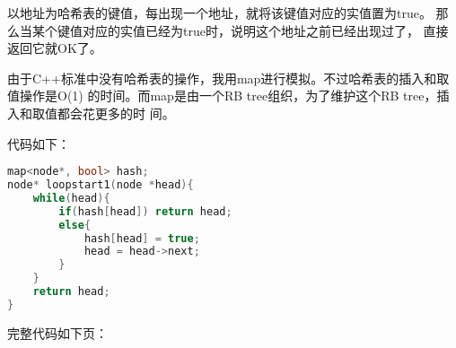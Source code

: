 \begin{description}
以地址为哈希表的键值，每出现一个地址，就将该键值对应的实值置为true。 那么当某个键值对应的实值已经为true时，说明这个地址之前已经出现过了， 直接返回它就OK了。

由于C++标准中没有哈希表的操作，我用map进行模拟。不过哈希表的插入和取值操作是O(1) 的时间。而map是由一个RB tree组织，为了维护这个RB tree，插入和取值都会花更多的时 间。

代码如下：

\begin{lstlisting}[language=C++]
map<node*, bool> hash;
node* loopstart1(node *head){
    while(head){
        if(hash[head]) return head;
        else{
            hash[head] = true;
            head = head->next;
        }
    }
    return head;
}
\end{lstlisting}

完整代码如下页：
%

\end{description}
